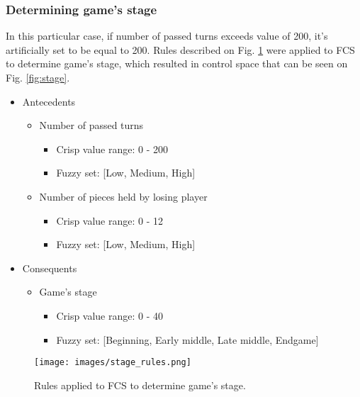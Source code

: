 \documentclass{article}
\begin{document}
\subsubsection{Determining game's stage}

In this particular case, if number of passed turns exceeds value of 200, it's artificially set to be equal to 200. Rules described on Fig. \ref{fig:stage_rules} were applied to FCS to determine game's stage, which resulted in control space that can be seen on Fig. \ref{fig:stage}.

\begin{itemize} 
\item Antecedents
     \begin{itemize} 
        \item Number of passed turns
            \begin{itemize}
                \item Crisp value range: 0 - 200
                \item Fuzzy set: [Low, Medium, High]
            \end{itemize}
        \item Number of pieces held by losing player
            \begin{itemize}
                \item Crisp value range: 0 - 12
                \item Fuzzy set: [Low, Medium, High]
            \end{itemize}
     \end{itemize}
\item Consequents
     \begin{itemize} 
        \item Game's stage
            \begin{itemize}
                \item Crisp value range: 0 - 40
                \item Fuzzy set: [Beginning, Early middle, Late middle, Endgame]
            \end{itemize}
     \end{itemize}
\end{itemize}

\begin{figure}[tbhp]
  \centering
      \texttt{[image: images/stage\_rules.png]}
  \caption{Rules applied to FCS to determine game's stage.}
  \label{fig:stage_rules}
\end{figure}
\end{document}
